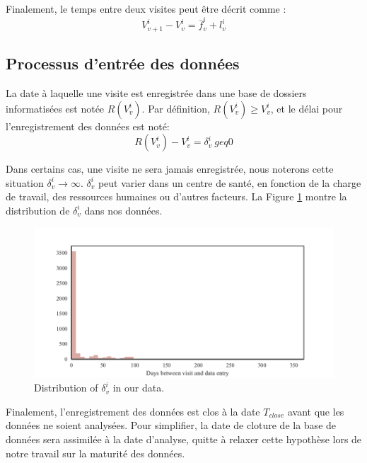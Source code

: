\documentclass[paper=a4, fontsize=11pt]{scrartcl}
\numberwithin{equation}{section}		%
\numberwithin{figure}{section}			%
\numberwithin{table}{section}				%
\begin{document}
Finalement, le temps entre deux visites peut être décrit comme :
$$V_{v+1}^i - V_v^i = \bar{f}_v^i + l_v^i  $$

\subsection{Processus d'entrée des données}

La date à laquelle une visite est enregistrée dans une base de dossiers informatisées est notée $R(V_v^i)$. Par définition, $R(V_v^i) \geq V_v^i$, et le délai pour l'enregistrement des données est noté:
$$R(V_v^i) - V_v^i = \delta_v^i \ geq 0$$

Dans certains cas, une visite ne sera jamais enregistrée, nous noterons cette situation $\delta_v^i \rightarrow \infty$. $\delta_v^i$ peut varier dans un centre de santé, en fonction de la charge de travail, des ressources humaines ou d'autres facteurs. La Figure \ref{fig:data_entry_time} montre la distribution de $\delta_v^i$ dans nos données.

\begin{center}
\begin{figure}[h]
\includegraphics[width=\textwidth]{figure/data_entry_time.pdf}
\caption{Distribution of $\delta_v^i$ in our data.}
\label{fig:data_entry_time}
\end{figure}
\end{center}

Finalement, l'enregistrement des données est clos à la date $T_{close}$ avant que les données ne soient analysées. Pour simplifier, la date de cloture de la base de données sera assimilée à la date d'analyse, quitte à relaxer cette hypothèse lors de notre travail sur la maturité des données.
\end{document}
